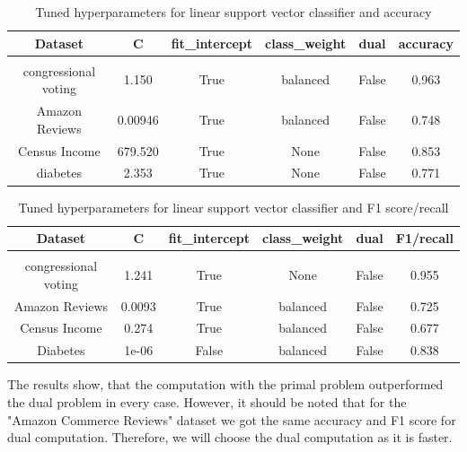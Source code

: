 \documentclass[a4paper,10pt]{article}
\begin{document}
\begin{table}[h!]
    \centering
    \begin{tabular}{|c|c|c|c|c|c|}
    \hline
    Dataset & \textsf{C} & \textsf{fit\_intercept} &  \textsf{class\_weight} & \textsf{dual} & accuracy \\
    \hline
    \multicolumn{6}{c}{\vspace{-0.4cm}} \\ %
    \hline
    congressional voting & 1.150 & True & balanced & False & 0.963 \\%
    \hline
    Amazon Reviews & 0.00946 & True & balanced & False & 0.748 \\%
    \hline
    Census Income & 679.520 & True & None & False & 0.853 \\%
    \hline
    diabetes & 2.353 & True & None & False  & 0.771 \\%
    \hline
    \end{tabular}
    \caption{Tuned hyperparameters for linear support vector classifier and accuracy} 
    \label{table:tu_hyp_svc_ac}
    \end{table}

\begin{table}[h!]
    \centering
    \begin{tabular}{|c|c|c|c|c|c|}
    \hline
    Dataset & \textsf{C} & \textsf{fit\_intercept} &  \textsf{class\_weight} & \textsf{dual} & F1/recall \\
    \hline
    \multicolumn{6}{c}{\vspace{-0.4cm}} \\ %
    \hline
    congressional voting & 1.241 & True & None & False & 0.955 \\%
    \hline
    Amazon Reviews & 0.0093 & True & balanced & False &  0.725 \\%
    \hline
    Census Income & 0.274 & True & balanced & False & 0.677 \\%
    \hline
    Diabetes & 1e-06 & False & balanced & False  & 0.838 \\%
    \hline
    \end{tabular}
    \caption{Tuned hyperparameters for linear support vector classifier and F1 score/recall} 
    \label{table:tu_hyp_svc_f1}
    \end{table}
    
The results show, that the computation with the primal problem outperformed the dual problem in every case. However, it should be noted that for the "Amazon Commerce Reviews" dataset we got the same accuracy and F1 score for dual computation. Therefore, we will choose the dual computation as it is faster.
\end{document}
